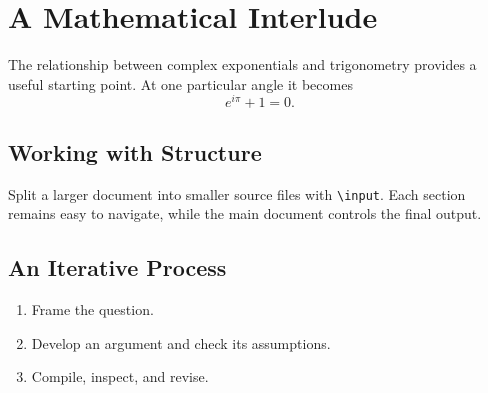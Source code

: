 \section{A Mathematical Interlude}
\label{sec:methods}
The relationship between complex exponentials and trigonometry provides
a useful starting point. At one particular angle it becomes
\begin{equation}
  e^{i\pi} + 1 = 0.
  \label{eq:euler}
\end{equation}

\subsection{Working with Structure}
Split a larger document into smaller source files with
\texttt{\textbackslash input}. Each section remains easy to navigate,
while the main document controls the final output.

\subsection{An Iterative Process}
\begin{enumerate}
  \item Frame the question.
  \item Develop an argument and check its assumptions.
  \item Compile, inspect, and revise.
\end{enumerate}
